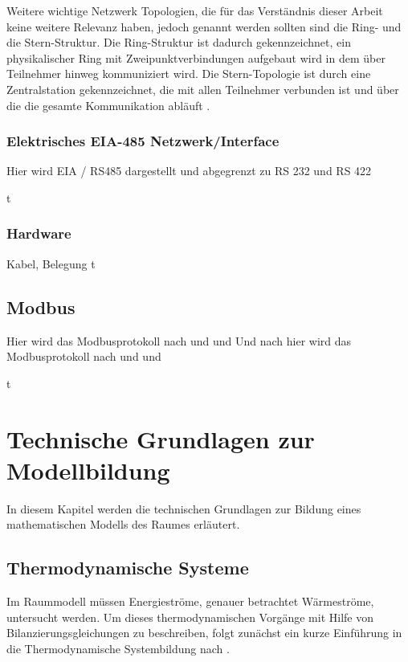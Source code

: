 Weitere wichtige Netzwerk Topologien, die für das Verständnis dieser Arbeit keine weitere Relevanz haben, jedoch genannt werden sollten sind die Ring- und die Stern-Struktur. Die Ring-Struktur ist dadurch gekennzeichnet, ein physikalischer Ring mit Zweipunktverbindungen aufgebaut wird in dem über Teilnehmer hinweg kommuniziert wird. Die Stern-Topologie ist durch eine Zentralstation gekennzeichnet, die mit allen Teilnehmer verbunden ist und über die die gesamte Kommunikation abläuft \cite[S.~6f.]{schn06}.

\subsubsection{Elektrisches EIA-485 Netzwerk/Interface}
Hier wird EIA / RS485 dargestellt und abgegrenzt zu RS 232 und RS 422

t 
\newpage
\subsubsection{Hardware}
Kabel, Belegung
t 
\newpage

\subsection{Modbus}
Hier wird das Modbusprotokoll nach \cite{mod12} und \cite{mod06ser} und \cite{mod06tcp}  
Und nach hier wird das Modbusprotokoll nach \cite[S.5]{mod12} und \cite[S.5]{mod06ser} und \cite[S.5]{mod06tcp}

t 
\newpage








\section{Technische Grundlagen zur Modellbildung}
\label{sec:grundlagenmodell}
In diesem Kapitel werden die technischen Grundlagen zur Bildung eines mathematischen Modells des Raumes erläutert.

\subsection{Thermodynamische Systeme}
Im Raummodell müssen Energieströme, genauer betrachtet Wärmeströme, untersucht werden. Um dieses thermodynamischen Vorgänge mit Hilfe von Bilanzierungsgleichungen zu beschreiben, folgt zunächst ein kurze Einführung in die Thermodynamische Systembildung nach \cite[S.~11ff.]{ba12}.

